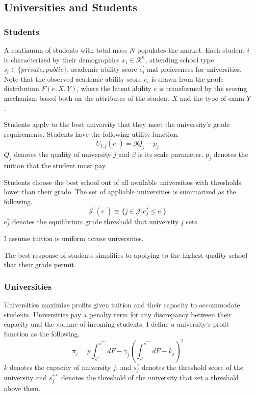 \subsection{Universities and Students}
\subsubsection{Students}
A continuum of students with total mass \(N\) populates the market. Each student \( i \) is characterized by their demographics \( x_i \in \mathcal{R}^n \), attending school type \( s_i \in \{private, public\} \), academic ability score \( e_i^\prime \) and preferences for universities. Note that the observed academic ability score \( e_i^\prime \) is drawn from the grade distribution \(F(e,X,Y)\), where the latent ability \(e\) is transformed by the scoring mechanism based both on the attributes of the student \(X\) and the type of exam
\(Y\).

Students apply to the best university that they meet the university's grade requirements. Students have the following utility function.
\begin{equation*}
    U_{i,j}(e^\prime) = \beta Q_j -p_j
\end{equation*}
\(Q_j\) denotes the quality of university \(j\) and \(\beta\) is its scale parameter. \(p_j\) denotes the tuition that the student must pay. 

Students choose the best school out of all available universities with thresholds lower than their grade. The set of appliable universities is summarized as the following.
\begin{equation*}
    \mathcal{J}^\prime(e^\prime) \equiv \{j\in \mathcal{J}| e_j^*\leq e^\prime\}
\end{equation*}
\(e_j^*\) denotes the equilibrium grade threshold that university \(j\) sets.

I assume tuition is uniform across universities. 

The best response of students simplifies to applying to the highest quality school that their grade permit.

\subsubsection{Universities}
Universities maximize profits given tuition and their capacity to accommodate students. Universities pay a penalty term for any discrepancy between their capacity and the volume of incoming students. I define a university's profit function as the following.
\begin{equation*}
    \pi_j = p\int_{s^*}^{s^{**}}dF -\gamma_j \left(\int_{s^*}^{s^{**}}dF-k_j \right) ^2
\end{equation*}
\(k\) denotes the capacity of university \(j\), and \(s_j^*\) denotes the threshold score of the university and \(s_j^{**}\) denotes the threshold of the university that set a threshold above them. 

